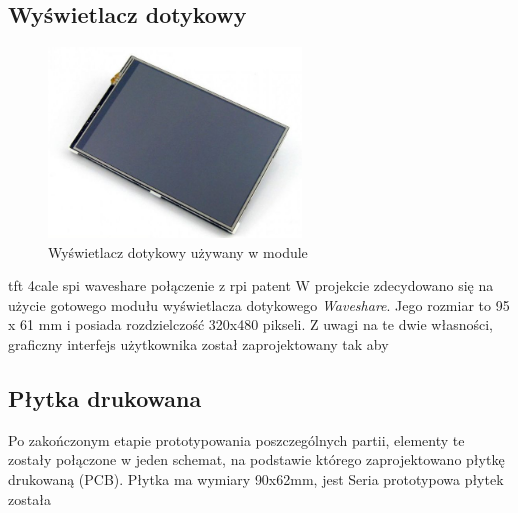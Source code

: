 \documentclass[12pt, eng, twoside, openany, final]{mgr}
\begin{document}
        \subsection{Wyświetlacz dotykowy}
            \begin{figure}[H]
            \begin{center}
                \includegraphics[width=0.6\textwidth]{wyswietlacz.jpg}
                \caption{Wyświetlacz dotykowy używany w module} 
            \end{center}
            \end{figure}
            tft 4cale spi waveshare połączenie z rpi patent
            W projekcie zdecydowano się na użycie gotowego modułu wyświetlacza dotykowego 
            \emph{Waveshare}. Jego rozmiar to 95 x 61 mm i posiada rozdzielczość 320x480 pikseli. Z uwagi na te dwie własności, graficzny interfejs użytkownika został zaprojektowany tak aby  

        
        \subsection{Płytka drukowana}
            Po zakończonym etapie prototypowania poszczególnych partii, elementy te zostały połączone w jeden schemat, na podstawie którego zaprojektowano płytkę drukowaną (PCB). 
            Płytka ma wymiary 90x62mm, jest 
            Seria prototypowa płytek została 
            
\end{document}
